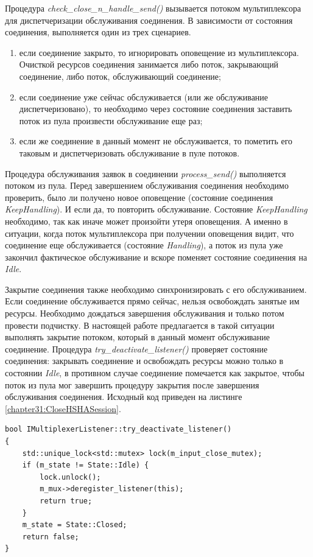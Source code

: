 Процедура \textit{check\_close\_n\_handle\_send()} вызывается потоком мультиплексора для диспетчеризации обслуживания соединения. В зависимости от состояния соединения, выполняется один из трех сценариев.
\begin{enumerate}
\item если соединение закрыто, то игнорировать оповещение из мультиплексора. Очисткой ресурсов соединения занимается либо поток, закрывающий соединение, либо поток, обслуживающий соединение;
\item если соединение уже сейчас обслуживается (или же обслуживание диспетчеризовано), то необходимо через состояние соединения заставить поток из пула произвести обслуживание еще раз;
\item если же соединение в данный момент не обслуживается, то пометить его таковым и диспетчеризовать обслуживание в пуле потоков.
\end{enumerate}

Процедура обслуживания заявок в соединении \textit{process\_send()} выполняется потоком из пула. Перед завершением обслуживания соединения необходимо проверить, было ли получено новое оповещение (состояние соединения \textit{KeepHandling}). И если да, то повторить обслуживание. Состояние \textit{KeepHandling} необходимо, так как иначе может произойти утеря оповещения. А именно в ситуации, когда поток мультиплексора при получении оповещения видит, что соединение еще обслуживается (состояние \textit{Handling}), а поток из пула уже закончил фактическое обслуживание и вскоре поменяет состояние соединения на \textit{Idle}.

Закрытие соединения также необходимо синхронизировать с его обслуживанием. Если соединение обслуживается прямо сейчас, нельзя освобождать занятые им ресурсы. Необходимо дождаться завершения обслуживания и только потом провести подчистку. В настоящей работе предлагается в такой ситуации выполнять закрытие потоком, который в данный момент обслуживание соединение. Процедура \textit{try\_deactivate\_listener()} проверяет состояние соединения: закрывать соединение и освобождать ресурсы можно только в состоянии \textit{Idle}, в противном случае соединение помечается как закрытое, чтобы поток из пула мог завершить процедуру закрытия после завершения обслуживания соединения. Исходный код приведен на листинге \ref{chapter31:CloseHSHASession}.

\begin{lstlisting}[float=!h,caption={Процедура закрытия соединения в мультиплексоре оповещений},label={chapter31:CloseHSHASession},frame=tlrb]
bool IMultiplexerListener::try_deactivate_listener()
{
    std::unique_lock<std::mutex> lock(m_input_close_mutex);
    if (m_state != State::Idle) {
        lock.unlock();
        m_mux->deregister_listener(this);
        return true;
    }
    m_state = State::Closed;
    return false;
}
\end{lstlisting}


